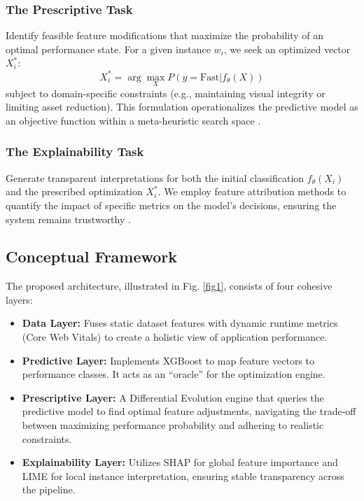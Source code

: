 \documentclass[conference]{IEEEtran}
\begin{document}
\subsubsection{The Prescriptive Task}
Identify feasible feature modifications that maximize the probability of an optimal performance state. For a given instance $w_{i}$, we seek an optimized vector $X_{i}^{*}$:
\begin{equation}
X_{i}^{*} = \arg \max_{X} P(y=\text{Fast} | f_{\theta}(X))
\end{equation}
subject to domain-specific constraints (e.g., maintaining visual integrity or limiting asset reduction). This formulation operationalizes the predictive model as an objective function within a meta-heuristic search space \cite{notz2024}.

\subsubsection{The Explainability Task}
Generate transparent interpretations for both the initial classification $f_{\theta}(X_{i})$ and the prescribed optimization $X_{i}^{*}$. We employ feature attribution methods to quantify the impact of specific metrics on the model's decisions, ensuring the system remains trustworthy \cite{salih2024}.

\subsection{Conceptual Framework}
The proposed architecture, illustrated in Fig. \ref{fig1}, consists of four cohesive layers:
\begin{itemize}
    \item \textbf{Data Layer:} Fuses static dataset features with dynamic runtime metrics (Core Web Vitals) to create a holistic view of application performance.
    \item \textbf{Predictive Layer:} Implements XGBoost to map feature vectors to performance classes. It acts as an ``oracle'' for the optimization engine.
    \item \textbf{Prescriptive Layer:} A Differential Evolution engine that queries the predictive model to find optimal feature adjustments, navigating the trade-off between maximizing performance probability and adhering to realistic constraints.
    \item \textbf{Explainability Layer:} Utilizes SHAP for global feature importance and LIME for local instance interpretation, ensuring stable transparency across the pipeline.
\end{itemize}
\end{document}
